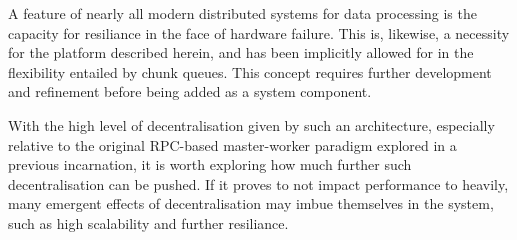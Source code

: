 \documentclass[a4paper,10pt]{article}
\begin{document}
A feature of nearly all modern distributed systems for data processing is the
capacity for resiliance in the face of hardware failure.
This is, likewise, a necessity for the platform described herein, and has been
implicitly allowed for in the flexibility entailed by chunk queues.
This concept requires further development and refinement before being added as
a system component.

With the high level of decentralisation given by such an architecture,
especially relative to the original RPC-based master-worker paradigm explored
in a previous incarnation, it is worth exploring how much further such
decentralisation can be pushed.
If it proves to not impact performance to heavily, many emergent effects of
decentralisation may imbue themselves in the system, such as high scalability
and further resiliance.

\printbibliography
\end{document}
